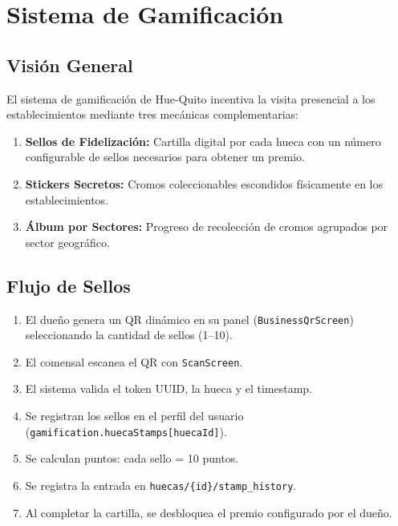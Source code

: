 \documentclass[11pt, a4paper, oneside]{report}
\begin{document}
\chapter{Sistema de Gamificación}

\section{Visión General}

El sistema de gamificación de Hue-Quito incentiva la visita presencial a los establecimientos mediante tres mecánicas complementarias:

\begin{enumerate}
  \item \textbf{Sellos de Fidelización:} Cartilla digital por cada hueca con un número configurable de sellos necesarios para obtener un premio.
  \item \textbf{Stickers Secretos:} Cromos coleccionables escondidos físicamente en los establecimientos.
  \item \textbf{Álbum por Sectores:} Progreso de recolección de cromos agrupados por sector geográfico.
\end{enumerate}

\section{Flujo de Sellos}

\begin{enumerate}
  \item El dueño genera un QR dinámico en su panel (\texttt{BusinessQrScreen}) seleccionando la cantidad de sellos (1--10).
  \item El comensal escanea el QR con \texttt{ScanScreen}.
  \item El sistema valida el token UUID, la hueca y el timestamp.
  \item Se registran los sellos en el perfil del usuario (\texttt{gamification.huecaStamps[huecaId]}).
  \item Se calculan puntos: cada sello = 10 puntos.
  \item Se registra la entrada en \texttt{huecas/\{id\}/stamp\_history}.
  \item Al completar la cartilla, se desbloquea el premio configurado por el dueño.
\end{enumerate}
\end{document}
